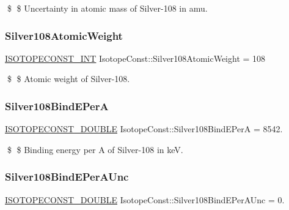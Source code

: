 \$ \$ Uncertainty in atomic mass of Silver-\/108 in amu. \mbox{\label{group___isotope_const-_silver-_ag108_ga857616df21bf87cd5be79813cc783c84}} 
\subsubsection{\texorpdfstring{Silver108\+Atomic\+Weight}{Silver108AtomicWeight}}
{\footnotesize\ttfamily \mbox{\hyperlink{group___isotope_const-_macros_ga5f18360b3e99483a35c32d789e62621c}{I\+S\+O\+T\+O\+P\+E\+C\+O\+N\+S\+T\+\_\+\+I\+NT}} Isotope\+Const\+::\+Silver108\+Atomic\+Weight = 108}

\$ \$ Atomic weight of Silver-\/108. \mbox{\label{group___isotope_const-_silver-_ag108_ga22711321ee28d8413ce18eb7d38a4507}} 
\subsubsection{\texorpdfstring{Silver108\+Bind\+E\+PerA}{Silver108BindEPerA}}
{\footnotesize\ttfamily \mbox{\hyperlink{group___isotope_const-_macros_ga8f45a7272ce02c0b4c65c44636ed719a}{I\+S\+O\+T\+O\+P\+E\+C\+O\+N\+S\+T\+\_\+\+D\+O\+U\+B\+LE}} Isotope\+Const\+::\+Silver108\+Bind\+E\+PerA = 8542.}

\$ \$ Binding energy per A of Silver-\/108 in keV. \mbox{\label{group___isotope_const-_silver-_ag108_gaa685ec7574ef0bb77e26ff957c31ca33}} 
\subsubsection{\texorpdfstring{Silver108\+Bind\+E\+Per\+A\+Unc}{Silver108BindEPerAUnc}}
{\footnotesize\ttfamily \mbox{\hyperlink{group___isotope_const-_macros_ga8f45a7272ce02c0b4c65c44636ed719a}{I\+S\+O\+T\+O\+P\+E\+C\+O\+N\+S\+T\+\_\+\+D\+O\+U\+B\+LE}} Isotope\+Const\+::\+Silver108\+Bind\+E\+Per\+A\+Unc = 0.}

